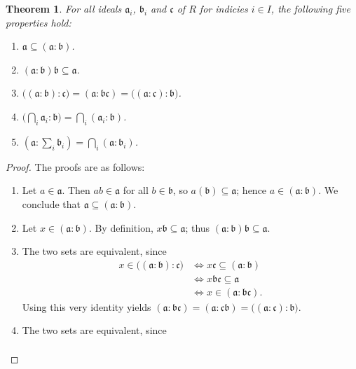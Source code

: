 \documentclass[11pt]{article}
\newtheorem{theorem}{Theorem}
\begin{document}
\begin{adjustwidth}{0.5cm}{}
	\begin{theorem}
		For all ideals $\mathfrak{a}_{i}$, $\mathfrak{b}_{i}$ and $\mathfrak{c}$ of $R$ for indicies $i \in I$, the following five properties hold:
		\begin{enumerate}
			\item $\mathfrak{a} \subseteq (\mathfrak{a} : \mathfrak{b})$.
			\item $(\mathfrak{a} : \mathfrak{b}) \mathfrak{b} \subseteq \mathfrak{a}$.
			\item $\big( (\mathfrak{a} : \mathfrak{b}) : \mathfrak{c} \big) = (\mathfrak{a} : \mathfrak{bc}) = \big( (\mathfrak{a} : \mathfrak{c}) : \mathfrak{b} \big)$.
			\item $\big( \bigcap_{i} \mathfrak{a}_{i} : \mathfrak{b} \big) = \bigcap_{i} (\mathfrak{a}_{i} : \mathfrak{b})$.
			\item $\left( \mathfrak{a} : \sum_{i} \mathfrak{b}_{i} \right) = \bigcap_{i} (\mathfrak{a} : \mathfrak{b}_{i})$.
		\end{enumerate}
	\end{theorem}
	\begin{proof}
		The proofs are as follows:
		\begin{enumerate}
			\item Let $a \in \mathfrak{a}$. Then $ab \in \mathfrak{a}$ for all $b \in \mathfrak{b}$, so $a(\mathfrak{b}) \subseteq \mathfrak{a}$; hence $a \in (\mathfrak{a} : \mathfrak{b})$. We conclude that $\mathfrak{a} \subseteq (\mathfrak{a} : \mathfrak{b})$.
			\item Let $x \in (\mathfrak{a} : \mathfrak{b})$. By definition, $x \mathfrak{b} \subseteq \mathfrak{a}$; thus $(\mathfrak{a} : \mathfrak{b}) \mathfrak{b} \subseteq \mathfrak{a}$.
			\item The two sets are equivalent, since 
			\begin{align*}
				x \in \big( (\mathfrak{a} : \mathfrak{b}) : \mathfrak{c} \big) &\iff x \mathfrak{c} \subseteq (\mathfrak{a} : \mathfrak{b}) \\
				&\iff x \mathfrak{bc} \subseteq \mathfrak{a} \\
				&\iff x \in (\mathfrak{a} : \mathfrak{bc}).
			\end{align*}
			Using this very identity yields $(\mathfrak{a} : \mathfrak{bc}) = (\mathfrak{a} : \mathfrak{cb}) = \big( (\mathfrak{a} : \mathfrak{c}) : \mathfrak{b} \big)$.
			\item The two sets are equivalent, since
			\begin{align*}

\end{align*}
\end{enumerate}
\end{proof}
\end{adjustwidth}
\end{document}
